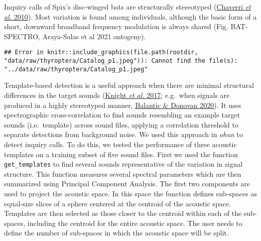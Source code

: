 \documentclass[
]{article}
\begin{document}
Inquiry calls of Spix's disc-winged bats are structurally stereotyped
(\protect\hyperlink{ref-Chaverri2010b}{Chaverri \emph{et al.} 2010}).
Most variation is found among individuals, although the basic form of a
short, downward broadband frequency modulation is always shared (Fig.
BAT-SPECTRO, Araya-Salas et al 2021 ontogeny).

\begin{verbatim}
## Error in knitr::include_graphics(file.path(rootdir, "data/raw/thyroptera/Catalog_p1.jpeg")): Cannot find the file(s): "../data/raw/thyroptera/Catalog_p1.jpeg"
\end{verbatim}

Template-based detection is a useful approach when there are minimal
structural differences in the target sounds
(\protect\hyperlink{ref-knight2017}{Knight \emph{et al.} 2017};
e.g.~when signals are produced in a highly stereotyped manner,
\protect\hyperlink{ref-balantic2020}{Balantic \& Donovan 2020}). It uses
spectrographic cross-correlation to find sounds resembling an example
target sounds (i.e.~template) across sound files, applying a correlation
threshold to separate detections from background noise. We used this
approach in \emph{ohun} to detect inquiry calls. To do this, we tested
the performance of three acoustic templates on a training subset of five
sound files. First we used the function \texttt{get\_templates} to find
several sounds representative of the variation in signal structure. This
function measures several spectral parameters which are then summarized
using Principal Component Analysis. The first two components are used to
project the acoustic space. In this space the function defines
sub-spaces as equal-size slices of a sphere centered at the centroid of
the acoustic space. Templates are then selected as those closer to the
centroid within each of the sub-spaces, including the centroid for the
entire acoustic space. The user needs to define the number of sub-spaces
in which the acoustic space will be split.
\end{document}
